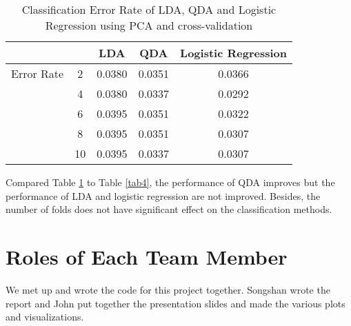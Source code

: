 \documentclass[12pt]{article}
\begin{document}
\begin{table}[htbp]
	\begin{center}
		\caption{\label{tab5} Classification Error Rate of LDA, QDA and Logistic Regression using PCA and cross-validation}
		\begin{tabular}{c|c|ccc}
			\hline
			&&LDA &QDA &Logistic Regression \\
			\hline
     Error Rate& 2&0.0380 &0.0351 &0.0366  \\
			\hline
			&4 &0.0380 &0.0337 &0.0292 \\
				\hline
		&6 &0.0395 &0.0351 &0.0322  \\
			\hline
		&8 &0.0395 &0.0351 &0.0307  \\
			\hline
	   &10 &0.0395 &0.0337 &0.0307  \\
			\hline
		\end{tabular}
	\end{center}
\end{table}

Compared Table \ref{tab5} to Table \ref{tab4}, the performance of QDA improves but the performance of LDA and logistic regression are not improved. Besides, the number of folds does not have significant effect on the classification methods.

\section{Roles of Each Team Member}

We met up and wrote the code for this project together. Songshan wrote the report and John put together the presentation slides and made the various plots and visualizations.
\end{document}
